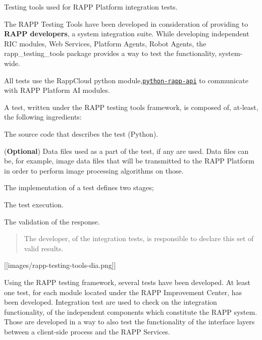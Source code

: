 Testing tools used for R\-A\-P\-P Platform integration tests.

The R\-A\-P\-P Testing Tools have been developed in consideration of providing to {\bfseries R\-A\-P\-P developers}, a system integration suite. While developing independent R\-I\-C modules, Web Services, Platform Agents, Robot Agents, the rapp\-\_\-testing\-\_\-tools package provides a way to test the functionality, system-\/wide.

All tests use the Rapp\-Cloud python module,\href{https://github.com/rapp-project/rapp-api/tree/master/python}{\tt python-\/rapp-\/api} to communicate with R\-A\-P\-P Platform A\-I modules.

A test, written under the R\-A\-P\-P testing tools framework, is composed of, at-\/least, the following ingredients\-:


\begin{DoxyItemize}
\item The source code that describes the test (Python).
\item ({\bfseries Optional}) Data files used as a part of the test, if any are used. Data files can be, for example, image data files that will be transmitted to the R\-A\-P\-P Platform in order to perform image processing algorithms on those.
\end{DoxyItemize}

The implementation of a test defines two stages;


\begin{DoxyItemize}
\item The test execution.
\item The validation of the response.
\end{DoxyItemize}

\begin{quotation}
The developer, of the integration tests, is responsible to declare this set of valid results.

\end{quotation}


\mbox{[}\mbox{[}images/rapp-\/testing-\/tools-\/dia.\-png\mbox{]}\mbox{]}

Using the R\-A\-P\-P testing framework, several tests have been developed. At least one test, for each module located under the R\-A\-P\-P Improvement Center, has been developed. Integration test are used to check on the integration functionality, of the independent components which constitute the R\-A\-P\-P system. Those are developed in a way to also test the functionality of the interface layers between a client-\/side process and the R\-A\-P\-P Services.

